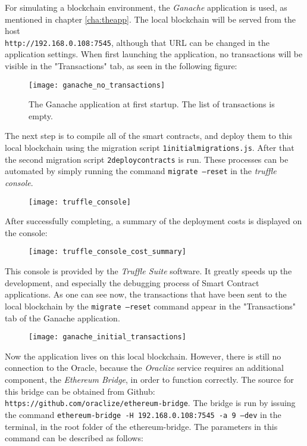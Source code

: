 For simulating a blockchain environment, the \emph{Ganache} application is used, as mentioned in chapter \ref{cha:theapp}. The local blockchain will be served from the host \\
\texttt{http://192.168.0.108:7545}, although that URL can be changed in the application settings. When first launching the application, no transactions will be visible in the "Transactions" tab, as seen in the following figure:
\begin{figure}[H]
\texttt{[image: ganache\_no\_transactions]}
\caption{The Ganache application at first startup. The list of transactions is empty.}
\end{figure}
The next step is to compile all of the smart contracts, and deploy them to this local blockchain using the migration script \texttt{1\textunderscore initial\textunderscore migrations.js}. After that the second migration script \texttt{2\textunderscore deploy\textunderscore contracts} is run. These processes can be automated by simply running the command \texttt{migrate --reset} in the \emph{truffle console}. 
\begin{figure}[H]
\texttt{[image: truffle\_console]}
\end{figure}
After successfully completing, a summary of the deployment costs is displayed on the console:
\begin{figure}[H]
\texttt{[image: truffle\_console\_cost\_summary]}
\end{figure}
This console is provided by the \emph{Truffle Suite} software. It greatly speeds up the development, and especially the debugging process of Smart Contract applications. As one can see now, the transactions that have been sent to the local blockchain by the \texttt{migrate --reset} command appear in the "Transactions" tab of the Ganache application.
\begin{figure}[H]
\texttt{[image: ganache\_initial\_transactions]}
\end{figure}
Now the application lives on this local blockchain. However, there is still no connection to the Oracle, because the \emph{Oraclize} service requires an additional component, the \emph{Ethereum Bridge}, in order to function correctly. The source for this bridge can be obtained from Github: \texttt{https://github.com/oraclize/ethereum-bridge}. The bridge is run by issuing the command \texttt{ethereum-bridge -H 192.168.0.108:7545 -a 9 --dev} in the terminal, in the root folder of the ethereum-bridge. The parameters in this command can be described as follows:
